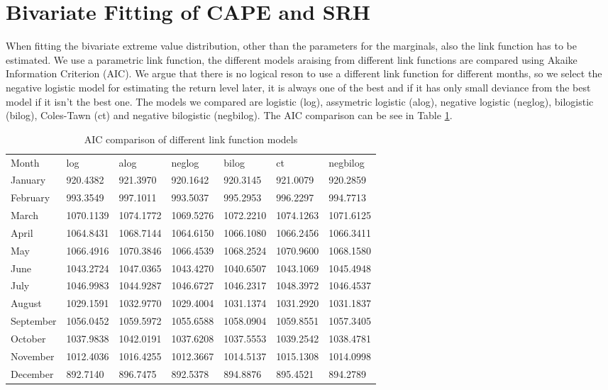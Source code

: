 \documentclass[10pt,conference,compsocconf]{IEEEtran}
\begin{document}
\section*{Bivariate Fitting of CAPE and SRH}
When fitting the bivariate extreme value distribution, other than the parameters for the marginals, also the link function has to be estimated. We use a parametric link function, the different models araising from different link functions are compared using Akaike Information Criterion (AIC). We argue that there is no logical reson to use a different link function for different months, so we select the negative logistic model for estimating the return level later, it is always one of the best and if it has only small deviance from the best model if it isn't the best one. The models we compared are logistic (log), assymetric logistic (alog), negative logistic (neglog), bilogistic (bilog), Coles-Tawn (ct) and negative bilogistic (negbilog). The AIC comparison can be see in Table \ref{table:cape_srh_AIC}.
\begin{table}[]
\begin{tabular}{lllllll}
Month     & log       & alog      & neglog    & bilog     & ct        & negbilog  \\
January   & 920.4382  & 921.3970  & 920.1642  & 920.3145  & 921.0079  & 920.2859  \\
February  & 993.3549  & 997.1011  & 993.5037  & 995.2953  & 996.2297  & 994.7713  \\
March     & 1070.1139 & 1074.1772 & 1069.5276 & 1072.2210 & 1074.1263 & 1071.6125 \\
April     & 1064.8431 & 1068.7144 & 1064.6150 & 1066.1080 & 1066.2456 & 1066.3411 \\
May       & 1066.4916 & 1070.3846 & 1066.4539 & 1068.2524 & 1070.9600 & 1068.1580 \\
June      & 1043.2724 & 1047.0365 & 1043.4270 & 1040.6507 & 1043.1069 & 1045.4948 \\
July      & 1046.9983 & 1044.9287 & 1046.6727 & 1046.2317 & 1048.3972 & 1046.4537 \\
August    & 1029.1591 & 1032.9770 & 1029.4004 & 1031.1374 & 1031.2920 & 1031.1837 \\
September & 1056.0452 & 1059.5972 & 1055.6588 & 1058.0904 & 1059.8551 & 1057.3405 \\
October   & 1037.9838 & 1042.0191 & 1037.6208 & 1037.5553 & 1039.2542 & 1038.4781 \\
November  & 1012.4036 & 1016.4255 & 1012.3667 & 1014.5137 & 1015.1308 & 1014.0998 \\
December  & 892.7140  & 896.7475  & 892.5378  & 894.8876  & 895.4521  & 894.2789 
\end{tabular}
\caption{AIC comparison of different link function models}
\label{table:cape_srh_AIC}
\end{table}
\end{document}
